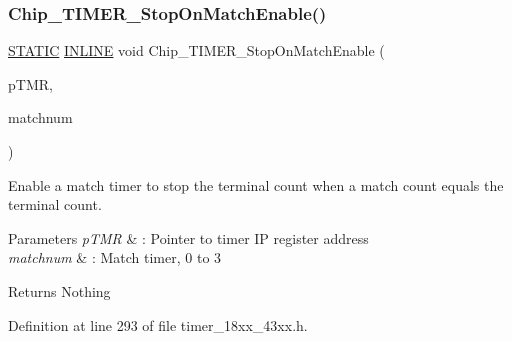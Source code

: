 \subsubsection{\texorpdfstring{Chip\+\_\+\+T\+I\+M\+E\+R\+\_\+\+Stop\+On\+Match\+Enable()}{Chip\_TIMER\_StopOnMatchEnable()}}
{\footnotesize\ttfamily \hyperlink{group___l_p_c___types___public___macros_ga10b2d890d871e1489bb02b7e70d9bdfb}{S\+T\+A\+T\+IC} \hyperlink{spifi__18xx__43xx_8h_a2eb6f9e0395b47b8d5e3eeae4fe0c116}{I\+N\+L\+I\+NE} void Chip\+\_\+\+T\+I\+M\+E\+R\+\_\+\+Stop\+On\+Match\+Enable (\begin{DoxyParamCaption}\item[{\hyperlink{struct_l_p_c___t_i_m_e_r___t}{L\+P\+C\+\_\+\+T\+I\+M\+E\+R\+\_\+T} $\ast$}]{p\+T\+MR,  }\item[{int8\+\_\+t}]{matchnum }\end{DoxyParamCaption})}



Enable a match timer to stop the terminal count when a match count equals the terminal count. 


\begin{DoxyParams}{Parameters}
{\em p\+T\+MR} & \+: Pointer to timer IP register address \\
\hline
{\em matchnum} & \+: Match timer, 0 to 3 \\
\hline
\end{DoxyParams}
\begin{DoxyReturn}{Returns}
Nothing 
\end{DoxyReturn}


Definition at line 293 of file timer\+\_\+18xx\+\_\+43xx.\+h.

\mbox{\label{group___t_i_m_e_r__18_x_x__43_x_x_ga676ac53fdb5dd31f0288ea5c5023709d}} 
